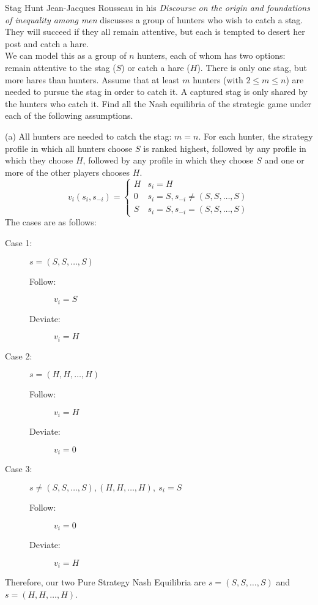 \documentclass[10pt]{extarticle}
\begin{document}
  \begin{problem}{Stag Hunt}
    Jean-Jacques Rousseau in his \textit{Discourse on the origin and foundations of inequality among men} discusses a group of hunters who wish to catch a stag. They will succeed if they all remain attentive, but each is tempted to desert her post and catch a hare.\\

    We can model this as a group of $n$ hunters, each of whom has two options: remain attentive to the stag ($S$) or catch a hare ($H$). There is only one stag, but more hares than hunters. Assume that at least $m$ hunters (with $2\leq m\leq n$) are needed to pursue the stag in order to catch it. A captured stag is only shared by the hunters who catch it. Find all the Nash equilibria of the strategic game under each of the following assumptions.
    \begin{problem}{(a)}
      All hunters are needed to catch the stag: $m=n$. For each hunter, the strategy profile in which all hunters choose $S$ is ranked highest, followed by any profile in which they choose $H$, followed by any profile in which they choose $S$ and one or more of the other players chooses $H$.
      \tcblower
      \[
        v_i(s_i,s_{-i}) = \begin{cases}
          H & s_i = H\\
          0 & s_i = S, s_{-i}\neq (S,S,\dots,S)\\
          S & s_i = S, s_{-i} = (S,S,\dots,S)
        \end{cases}
      \] 
      The cases are as follows:
      \begin{description}
        \item[Case 1:] $s = (S,S,\dots,S)$
          \begin{description}
            \item[Follow:] $v_i = S$
            \item[Deviate:] $v_i = H$
          \end{description}
        \item[Case 2:] $s = (H,H,\dots,H)$
          \begin{description}
            \item[Follow:] $v_i = H$
            \item[Deviate:] $v_i = 0$
          \end{description}
        \item[Case 3:] $s \neq (S,S,\dots,S), (H,H,\dots,H),~s_i = S$ 
          \begin{description}
            \item[Follow:] $v_i = 0$
            \item[Deviate:] $v_i = H$
          \end{description}
      \end{description}
      Therefore, our two Pure Strategy Nash Equilibria are $s=(S,S,\dots,S)$ and $s = (H,H,\dots,H)$.
    \end{problem}
  \end{problem}
\end{document}

